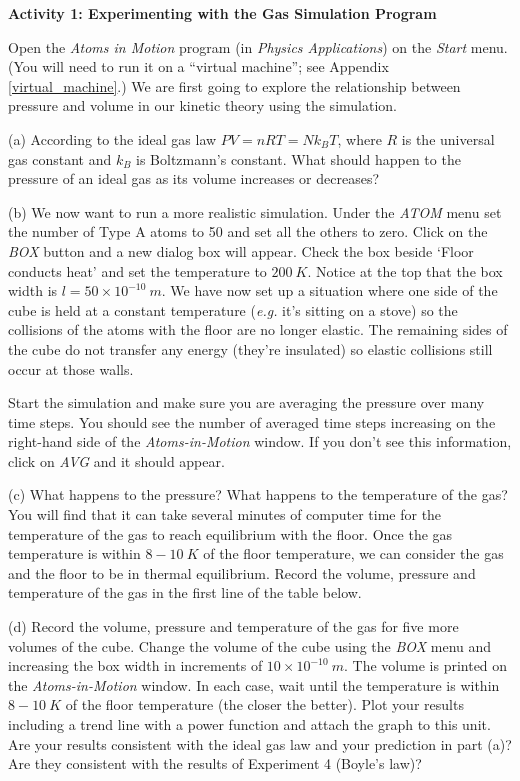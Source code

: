 \textbf{Activity 1: Experimenting with the Gas Simulation Program}

Open the {\it Atoms in Motion} program (in {\it Physics Applications}) on the {\it Start} menu.
(You will need to run it on a ``virtual machine''; see Appendix \ref{virtual_machine}.)  We are first going to explore the relationship between pressure and volume in
our kinetic theory using the simulation. 

(a) According to the ideal gas law \( PV = nRT = Nk_{B}T \), where \( R \) is the universal gas constant and \( k_{B} \) is Boltzmann's constant. What
should happen to the pressure of an ideal gas as its volume increases
or decreases?
\vspace{1.0in}

(b) We now want to run a more realistic simulation.
Under the {\it ATOM} menu set the number of Type A atoms to 50 and set all the others to zero.
Click on the {\it BOX} button and a new dialog box will appear.
Check the box beside `Floor conducts heat' and set the temperature to $200~K$.
Notice at the top that the box width is $l=50 \times 10^{-10}~m$.
We have now set up a situation where one side of the cube is held at a constant
temperature ({\it e.g.} it's sitting on a stove) so the collisions of the atoms with the
floor are no longer elastic.
The remaining sides of the
cube do not transfer any energy (they're insulated) so elastic collisions still occur 
at those walls.

Start
the simulation and make sure you are averaging the pressure over many time steps.
You should see the number of averaged time steps increasing on the right-hand side 
of the {\it Atoms-in-Motion} window. 
If you don't see this information, click on {\it AVG} and it should appear.

\newpage

(c) What happens to the pressure?
What happens to the temperature of the gas? 
You will find that it can take several minutes of computer time for the temperature of the gas to reach equilibrium with the floor.
Once the gas temperature is within $8-10~K$ of the floor temperature, we can consider the gas and the floor to be in thermal equilibrium. Record the volume, pressure and temperature of the gas in the first line of the table below.
\vspace{20mm}

(d) Record the volume, pressure and temperature of the gas for five more volumes of the cube. Change the volume of the cube using the {\it BOX} menu and 
increasing the box width in increments of $10 \times 10^{-10}~m$. The volume 
is printed on the {\it Atoms-in-Motion} window. In each case, wait until the
temperature is within $8-10~K$ of the floor temperature (the closer the better).
Plot your results including a trend line with a power function and attach the 
graph to this unit. Are your results consistent with the ideal gas law and
your prediction in part (a)? Are they consistent with the results of 
Experiment 4 (Boyle's law)?

